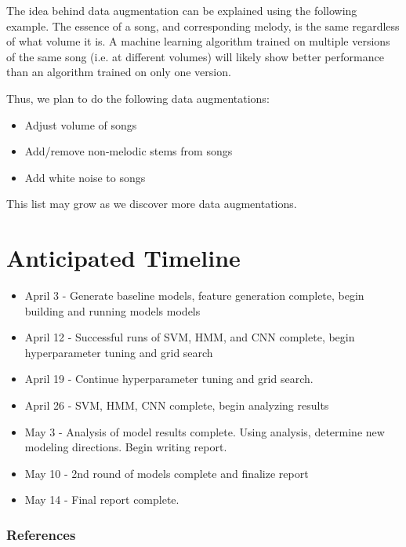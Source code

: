 \documentclass{article} %
\begin{document}
The idea behind data augmentation can be explained using the following example.  The essence of a song, and corresponding melody, is the same regardless of what volume it is.  A machine learning algorithm trained on multiple versions of the same song (i.e. at different volumes) will likely show better performance than an algorithm trained on only one version.

Thus, we plan to do the following data augmentations:

\begin{itemize}
\item Adjust volume of songs
\item Add/remove non-melodic stems from songs
\item Add white noise to songs
\end{itemize}

This list may grow as we discover more data augmentations.





\section{Anticipated Timeline}

\begin{itemize}
\item April 3 - Generate baseline models, feature generation complete, begin building and running models models
\item April 12 - Successful runs of SVM, HMM, and CNN complete, begin hyperparameter tuning and grid search
\item April 19 - Continue hyperparameter tuning and grid search.
\item April 26 - SVM, HMM, CNN complete, begin analyzing results
\item May 3 - Analysis of model results complete.  Using analysis, determine new modeling directions.  Begin writing report.
\item May 10 - 2nd round of models complete and finalize report
\item May 14 - Final report complete.
\end{itemize}




\subsubsection*{References}
\end{document}
